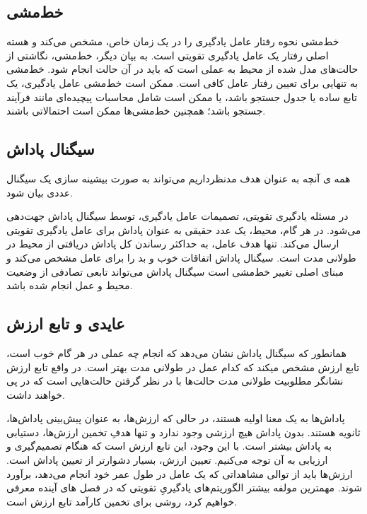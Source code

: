 \subsection{خط‌مشی}
خط‌مشی نحوه رفتار عامل یادگیری را در یک زمان خاص، مشخص می‌کند و هسته اصلی رفتار یک عامل یادگیری تقویتی است. به بیان دیگر، خط‌مشی، نگاشتی از حالت‌های مدل شده از محیط به عملی است که باید در آن حالت انجام شود. خط‌مشی به تنهایی برای تعیین رفتار عامل کافی است. ممکن است
خط‌مشی عامل یادگیری، یک تابع ساده یا جدول جستجو باشد، یا ممکن است شامل محاسبات پیچیده‌ای مانند فرآیند جستجو باشد؛ همچنین
خط‌مشی‌ها ممکن است احتمالاتی باشند.


\subsection{سیگنال پاداش}

همه ی آنچه به عنوان هدف مدنظرداریم می‌تواند به صورت بیشینه سازی  یک سیگنال عددی بیان شود.

در مسئله یادگیری تقویتی، تصمیمات عامل یادگیری، توسط سیگنال پاداش جهت‌دهی می‌شود. در هر گام، محیط، یک عدد حقیقی به عنوان پاداش برای عامل یادگیری تقویتی ارسال می‌کند. تنها هدف عامل، به حداکثر رساندن کل پاداش دریافتی از محیط در طولانی مدت است. سیگنال پاداش اتفاقات خوب و بد را برای عامل مشخص می‌کند و مبنای اصلی تغییر خط‌مشی است
سیگنال پاداش می‌تواند تابعی تصادفی از وضعیت محیط و عمل انجام شده باشد.


\subsection{عایدی و تابع ارزش}
همانطور که سیگنال پاداش نشان می‌دهد که انجام چه عملی در هر گام خوب است، تابع ارزش مشخص می\nf کند که کدام عمل در طولانی مدت بهتر است. در واقع تابع ارزش نشانگر مطلوبیت طولانی مدت حالت‌ها با در نظر گرفتن حالت‌هایی است که در پی خواهند داشت.

پاداش‌ها به یک معنا اولیه هستند، در حالی که ارزش‌ها، به عنوان پیش‌بینی پاداش‌ها، ثانویه هستند. بدون پاداش هیچ ارزشی وجود ندارد و تنها هدفِ تخمین ارزش‌ها، دستیابی به پاداش بیشتر است. با این وجود، این تابع ارزش است که هنگام تصمیم‌گیری و ارزیابی به آن توجه می‌کنیم.
تعیین ارزش،‌ بسیار دشوارتر از تعیین پاداش است.
ارزش‌ها باید از توالی مشاهداتی که یک عامل در طول عمر خود انجام می‌دهد، برآورد شوند.
مهمترین مولفه بیشتر الگوریتم‌های یادگیریِ تقویتی که در  فصل های آینده معرفی خواهیم کرد، روشی برای تخمین کارآمد تابع ارزش است.

